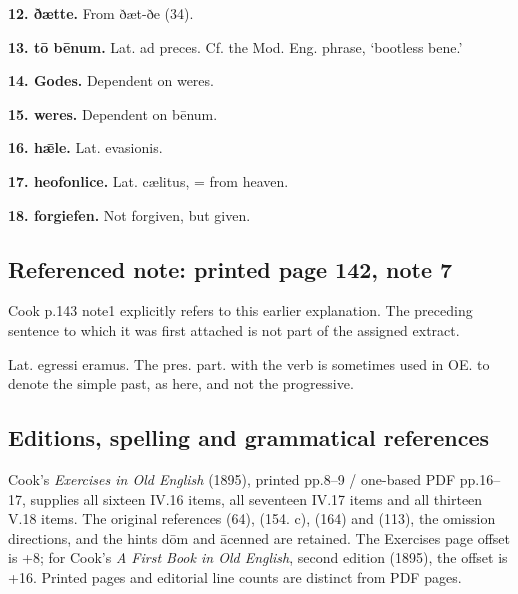 \textbf{12. ðætte.} From ðæt-ðe (34).

\textbf{13. tō bēnum.} Lat. ad preces. Cf. the Mod. Eng. phrase, ‘bootless bene.’

\textbf{14. Godes.} Dependent on weres.

\textbf{15. weres.} Dependent on bēnum.

\textbf{16. hǣle.} Lat. evasionis.

\textbf{17. heofonlice.} Lat. cælitus, = from heaven.

\textbf{18. forgiefen.} Not forgiven, but given.

\subsection*{Referenced note: printed page 142, note 7}

Cook p.143 note1 explicitly refers to this earlier explanation. The preceding sentence to which it was first attached is not part of the assigned extract.

Lat. egressi eramus. The pres. part. with the verb is sometimes used in OE. to denote the simple past, as here, and not the progressive.

\subsection*{Editions, spelling and grammatical references}

Cook’s \emph{Exercises in Old English} (1895), printed pp.8–9 /\allowbreak{} one-based PDF pp.16–17, supplies all sixteen IV.16 items, all seventeen IV.17 items and all thirteen V.18 items. The original references (64), (154. c), (164) and (113), the omission directions, and the hints dōm and ācenned are retained. The Exercises page offset is +8; for Cook’s \emph{A First Book in Old English}, second edition (1895), the offset is +16. Printed pages and editorial line counts are distinct from PDF pages.

